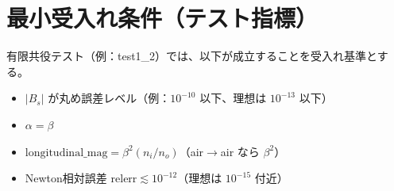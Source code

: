\section{最小受入れ条件（テスト指標）}
有限共役テスト（例：test1\_2）では、以下が成立することを受入れ基準とする。
\begin{itemize}
  \item $|B_s|$ が丸め誤差レベル（例：$10^{-10}$ 以下、理想は $10^{-13}$ 以下）
  \item $\alpha=\beta$
  \item $\mathrm{longitudinal\_mag}=\beta^2(n_i/n_o)$（air$\to$air なら $\beta^2$）
  \item Newton相対誤差 $\mathrm{relerr}\lesssim 10^{-12}$（理想は $10^{-15}$ 付近）
\end{itemize}



